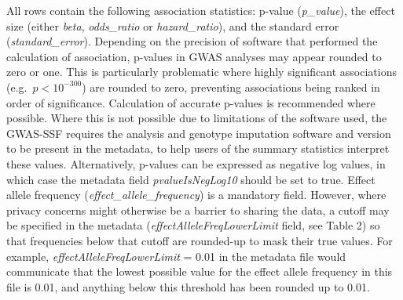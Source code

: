 \documentclass[11pt]{article}
\begin{document}
All rows contain the following association statistics: p-value (\textit{p\_value}), the effect size (either \textit{beta}, \textit{odds\_ratio} or \textit{hazard\_ratio}), and the standard error (\textit{standard\_error}). Depending on the precision of software that performed the calculation of association, p-values in GWAS analyses may appear rounded to zero or one. This is particularly problematic where highly significant associations (e.g.\ $p < 10^{-300}$) are rounded to zero, preventing associations being ranked in order of significance. Calculation of accurate p-values is recommended where possible. Where this is not possible due to limitations of the software used, the GWAS-SSF requires the analysis and genotype imputation software and version to be present in the metadata, to help users of the summary statistics interpret these values. Alternatively, p-values can be expressed as negative log values, in which case the metadata field \textit{pvalueIsNegLog10} should be set to true. Effect allele frequency (\textit{effect\_allele\_frequency}) is a mandatory field. However, where privacy concerns might otherwise be a barrier to sharing the data, a cutoff may be specified in the metadata (\textit{effectAlleleFreqLowerLimit} field, see Table 2) so that frequencies below that cutoff are rounded-up to mask their true values. For example, \textit{effectAlleleFreqLowerLimit} = 0.01 in the metadata file would communicate that the lowest possible value for the effect allele frequency in this file is 0.01, and anything below this threshold has been rounded up to 0.01.
\end{document}

